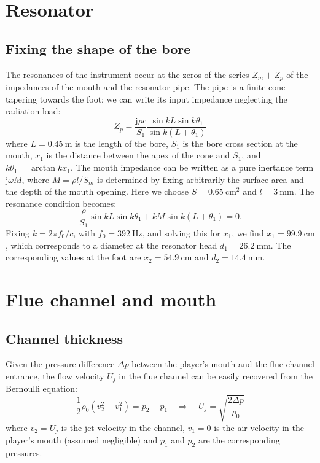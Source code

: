 \documentclass[a4paper]{article}
\begin{document}
\section{Resonator}
\subsection{Fixing the shape of the bore}
The resonances of the instrument occur at the zeros of the series $Z_m + Z_p$ of the impedances of the mouth and the resonator pipe. The pipe is a finite cone tapering towards the foot; we can write its input impedance neglecting the radiation load:
$$ Z_p = \frac{\mathrm{j} \rho c }{S_1} \frac{\sin kL \sin k\theta_1}{\sin k(L+\theta_1)} $$
where $L = 0.45~\si{\meter}$ is the length of the bore, $S_1$ is the bore cross section at the mouth, $x_1$ is the distance between the apex of the cone and $S_1$, and $k\theta_1 = \arctan kx_1 $.
The mouth impedance can be written as a pure inertance term $\mathrm{j} \omega M$, where $M = \rho l / S_m$ is determined by fixing arbitrarily the surface area and the depth of the mouth opening. Here we choose $S = 0.65~\si{\centi\meter\squared}$ and $l = 3~\si{\milli\meter}$. 
The resonance condition becomes:
$$ \frac{\rho}{S_1} \sin kL \sin k\theta_1 + kM\sin k(L+\theta_1) = 0 .$$ 
Fixing $k = 2\pi f_0 /c$, with $f_0 = 392~\si{\hertz}$, and solving this for $x_1$, we find $x_1 = 99.9~\si{\centi\meter}$, which corresponds to a diameter at the resonator head $d_1 = 26.2~\si{\milli\meter}$. The corresponding values at the foot are $x_2 = 54.9~\si{\centi\meter}$ and $d_2 = 14.4~\si{\milli\meter}$.

\section{Flue channel and mouth}
\subsection{Channel thickness}

Given the pressure difference $\Delta p$ between the player's mouth and the flue channel entrance, the flow velocity $U_j$ in the flue channel can be easily recovered from the Bernoulli equation:
\[
	\frac{1}{2} \rho_0 \left( v_2^2 - v_1^2 \right) = p_2 - p_1 \quad \Rightarrow \quad
	U_j = \sqrt{\frac{2\Delta p}{\rho_0}}
\]
where $v_2 = U_j$ is the jet velocity in the channel, $v_1 = 0$ is the air velocity in the player's mouth (assumed negligible) and $p_1$ and $p_2$ are the corresponding pressures.
\end{document}
